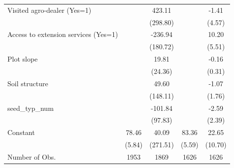 {\begin{tabular}{l*{4}{c}}
Visited agro-dealer (Yes=1)&                  &   423.11         &                  &    -1.41         \\
                &                  & (298.80)         &                  &   (4.57)         \\
Access to extension services (Yes=1)&                  &  -236.94         &                  &    10.20\sym{*}  \\
                &                  & (180.72)         &                  &   (5.51)         \\
Plot slope      &                  &    19.81         &                  &    -0.16         \\
                &                  &  (24.36)         &                  &   (0.31)         \\
Soil structure  &                  &    49.60         &                  &    -1.07         \\
                &                  & (148.11)         &                  &   (1.76)         \\
seed\_typ\_num    &                  &  -101.84         &                  &    -2.59         \\
                &                  &  (97.83)         &                  &   (2.39)         \\
Constant        &    78.46\sym{***}&    40.09         &    83.36\sym{***}&    22.65\sym{**} \\
                &   (5.84)         & (271.51)         &   (5.59)         &  (10.70)         \\
\hline
Number of Obs.  &     1953         &     1869         &     1626         &     1626         \\
\hline\hline
\end{tabular}
}
